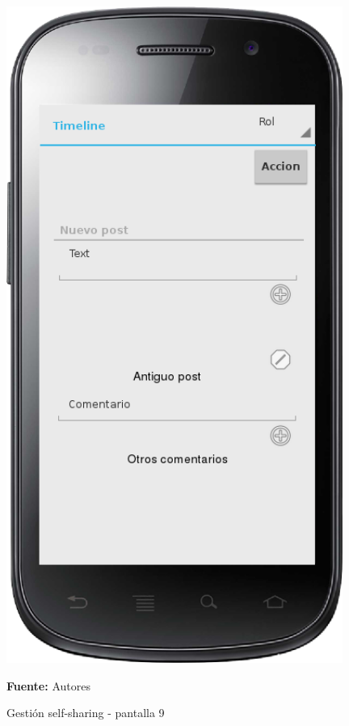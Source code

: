 \begin{figure}[!htb]
  \begin{center}
    \includegraphics[width=11cm]{./imagenes/UI/Self_sharing/self_sharing_9.png}
    \caption{Gestión self-sharing - pantalla 9}
    \label{fig:self_sharing_9}
    \textbf{Fuente:}  Autores
  \end{center}
\end{figure}

